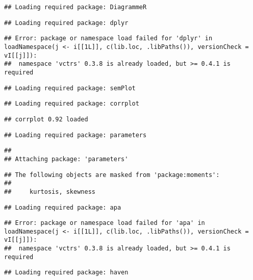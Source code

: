 \documentclass[
]{article}
\begin{document}
\begin{verbatim}
## Loading required package: DiagrammeR
\end{verbatim}

\begin{verbatim}
## Loading required package: dplyr
\end{verbatim}

\begin{verbatim}
## Error: package or namespace load failed for 'dplyr' in loadNamespace(j <- i[[1L]], c(lib.loc, .libPaths()), versionCheck = vI[[j]]):
##  namespace 'vctrs' 0.3.8 is already loaded, but >= 0.4.1 is required
\end{verbatim}

\begin{verbatim}
## Loading required package: semPlot
\end{verbatim}

\begin{verbatim}
## Loading required package: corrplot
\end{verbatim}

\begin{verbatim}
## corrplot 0.92 loaded
\end{verbatim}

\begin{verbatim}
## Loading required package: parameters
\end{verbatim}

\begin{verbatim}
## 
## Attaching package: 'parameters'
\end{verbatim}

\begin{verbatim}
## The following objects are masked from 'package:moments':
## 
##     kurtosis, skewness
\end{verbatim}

\begin{verbatim}
## Loading required package: apa
\end{verbatim}

\begin{verbatim}
## Error: package or namespace load failed for 'apa' in loadNamespace(j <- i[[1L]], c(lib.loc, .libPaths()), versionCheck = vI[[j]]):
##  namespace 'vctrs' 0.3.8 is already loaded, but >= 0.4.1 is required
\end{verbatim}

\begin{verbatim}
## Loading required package: haven
\end{verbatim}
\end{document}

